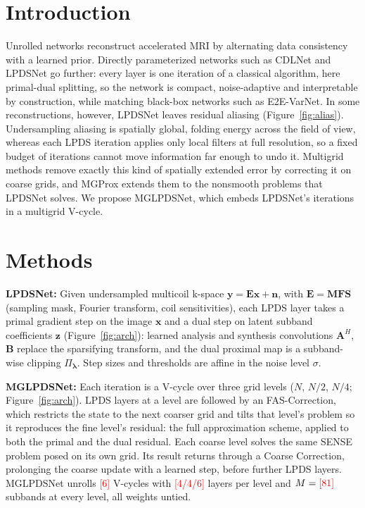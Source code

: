 \documentclass[10pt]{article}
\newcommand{\todo}[1]{\textcolor{red}{[#1]}}
\begin{document}
\section*{Introduction}
Unrolled networks reconstruct accelerated MRI by alternating data consistency with a learned
prior. Directly parameterized networks such as CDLNet\cite{ref_cdlnet} and
LPDSNet\cite{ref_lpdsnet} go further: every layer is one iteration of a classical algorithm, here
primal-dual splitting, so the network is compact, noise-adaptive and interpretable by
construction, while matching black-box networks such as E2E-VarNet\cite{ref_varnet}. In some
reconstructions, however, LPDSNet leaves residual aliasing (Figure~\ref{fig:alias}). Undersampling
aliasing is spatially global, folding energy across the field of view, whereas each LPDS iteration
applies only local filters at full resolution, so a fixed budget of iterations cannot move
information far enough to undo it. Multigrid methods remove exactly this kind of spatially
extended error by correcting it on coarse grids\cite{ref_brandt}, and MGProx\cite{ref_mgprox}
extends them to the nonsmooth problems that LPDSNet solves. We propose MGLPDSNet, which embeds
LPDSNet's iterations in a multigrid V-cycle.

\section*{Methods}
\textbf{LPDSNet:} Given undersampled multicoil k-space $\bm y=\bm E\bm x+\bm n$, with
$\bm E=\bm M\bm F\bm S$ (sampling mask, Fourier transform, coil sensitivities), each LPDS layer takes
a primal gradient step on the image $\bm x$ and a dual step on latent subband coefficients $\bm z$
(Figure~\ref{fig:arch}): learned analysis and synthesis convolutions $\bm A^H$, $\bm B$ replace the
sparsifying transform, and the dual proximal map is a subband-wise clipping $\Pi_{\bm\lambda}$.
Step sizes and thresholds are affine in the noise level $\sigma$\cite{ref_cdlnet,ref_lpdsnet}.

\textbf{MGLPDSNet:} Each iteration is a V-cycle over three grid levels ($N$, $N/2$, $N/4$;
Figure~\ref{fig:arch}). LPDS layers at a level are followed by an FAS-Correction, which restricts
the state to the next coarser grid and tilts that level's problem so it reproduces the fine
level's residual: the full approximation scheme\cite{ref_brandt}, applied to both the primal and
the dual residual. Each coarse level solves the same SENSE problem posed on its own grid. Its
result returns through a Coarse Correction, prolonging the coarse update with a learned step,
before further LPDS layers. MGLPDSNet unrolls \todo{6} V-cycles with \todo{4/4/6} layers per level
and $M=\todo{81}$ subbands at every level, all weights untied.
\end{document}
